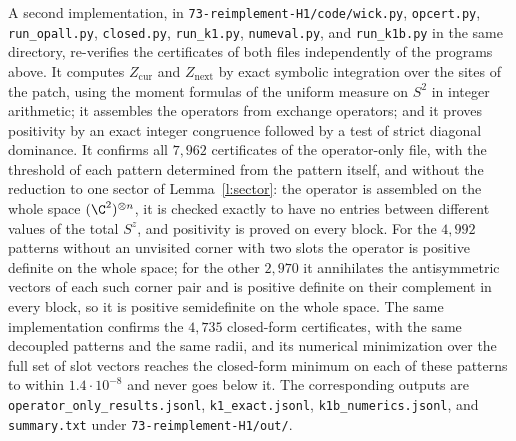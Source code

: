 A second implementation, in \texttt{73-\allowbreak reimplement-\allowbreak H1/\allowbreak code/\linebreak[1]wick.py},\linebreak
\texttt{opcert.py}, \texttt{run\_\allowbreak opall.py}, \texttt{closed.py}, \texttt{run\_\allowbreak k1.py}, \texttt{numeval.py}, and \texttt{run\_\allowbreak k1b.py} in the same directory, re-verifies the certificates of both files independently of the programs above. It computes $Z_{\mathrm{cur}}$ and $Z_{\mathrm{next}}$ by exact symbolic integration over the sites of the patch, using the moment formulas of the uniform measure on $S^2$ in integer arithmetic; it assembles the operators from exchange operators; and it proves positivity by an exact integer congruence followed by a test of strict diagonal dominance. It confirms all $7{, }962$ certificates of the operator-only file, with the threshold of each pattern determined from the pattern itself, and without the reduction to one sector of Lemma~\ref{l:sector}: the operator is assembled on the whole space $(\C^2)^{\otimes n}$, it is checked exactly to have no entries between different values of the total $S^z$, and positivity is proved on every block. For the $4{, }992$ patterns without an unvisited corner with two slots the operator is positive definite on the whole space; for the other $2{, }970$ it annihilates the antisymmetric vectors of each such corner pair and is positive definite on their complement in every block, so it is positive semidefinite on the whole space. The same implementation confirms the $4{, }735$ closed-form certificates, with the same decoupled patterns and the same radii, and its numerical minimization over the full set of slot vectors reaches the closed-form minimum on each of these patterns to within $1.4 \cdot 10^{-8}$ and never goes below it. The corresponding outputs are \texttt{operator\_\allowbreak only\_\allowbreak results.jsonl}, \texttt{k1\_\allowbreak exact.jsonl}, \texttt{k1b\_\allowbreak numerics.jsonl}, and \texttt{summary.txt} under \texttt{73-\allowbreak reimplement-\allowbreak H1/\allowbreak out/\allowbreak }.

